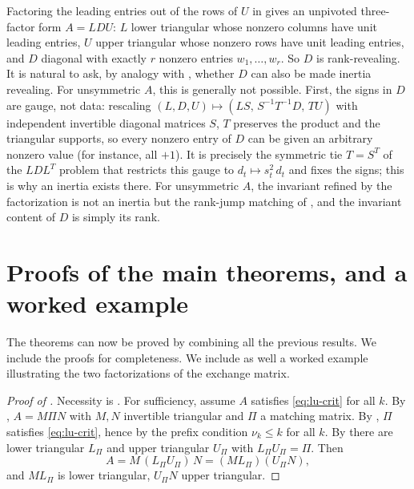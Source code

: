\documentclass[preprint,12pt]{elsarticle}
\theoremstyle{plain}
\theoremstyle{nonumberplain}
\newtheorem{proof}{Proof}
\numberwithin{equation}{section}
\numberwithin{theorem}{section}
\begin{document}
\begin{remark}\label{rem:ldu}
  Factoring the leading entries out of the rows of $U$ in  gives an unpivoted three-factor form $A = LDU$: $L$ lower triangular whose nonzero columns have unit leading entries, $U$ upper triangular whose nonzero rows have unit leading entries, and $D$ diagonal with exactly $r$ nonzero entries $w_1, \ldots, w_r$. So $D$ is rank-revealing.  It is natural to ask, by analogy with , whether $D$ can also be made inertia revealing.  For unsymmetric $A$, this is generally not possible. First, the signs in $D$ are gauge, not data: rescaling $(L, D, U) \mapsto (LS,\, S^{-1}T^{-1}D,\, TU)$ with independent invertible diagonal matrices $S$, $T$ preserves the product and the triangular supports, so every nonzero entry of $D$ can be given an arbitrary nonzero value (for instance, all $+1$).  It is precisely the symmetric tie $T = S^T$ of the $LDL^T$ problem that restricts this gauge to $d_t \mapsto s_t^2\, d_t$ and fixes the signs; this is why an inertia exists there.  For unsymmetric $A$, the invariant refined by the factorization is not an inertia but the rank-jump matching of , and the invariant content of $D$ is simply its rank.
\end{remark}

\section{Proofs of the main theorems, and a worked example}\label{sec:assembly}

The theorems can now be proved by combining all the previous results. We include the proofs for completeness. We include as well a worked example illustrating the two factorizations of the exchange matrix.

\begin{proof}[Proof of ]
  Necessity is .  For sufficiency, assume $A$ satisfies
  \cref{eq:lu-crit} for all $k$.  By ,
  $A = M \Pi N$ with $M, N$ invertible triangular and $\Pi$ a matching matrix.
  By , $\Pi$ satisfies \cref{eq:lu-crit}, hence
  by  the prefix condition $\nu_k \le k$ for all $k$.  By
   there are lower triangular $L_\Pi$ and upper
  triangular $U_\Pi$ with $L_\Pi U_\Pi = \Pi$.  Then
  \[
    A = M \, (L_\Pi U_\Pi) \, N = (M L_\Pi)(U_\Pi N),
  \]
  and $M L_\Pi$ is lower triangular, $U_\Pi N$ upper triangular.
\end{proof}
\end{document}
